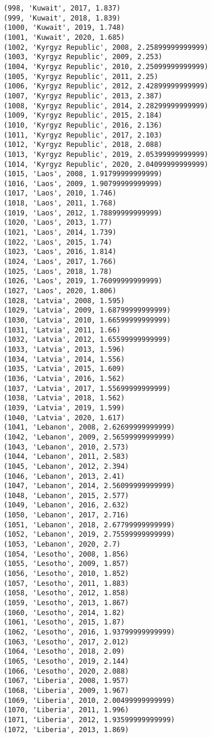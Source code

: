 \documentclass[11pt]{article}
\begin{document}
\begin{Verbatim}[commandchars=\\\{\}]
(998, 'Kuwait', 2017, 1.837)
(999, 'Kuwait', 2018, 1.839)
(1000, 'Kuwait', 2019, 1.748)
(1001, 'Kuwait', 2020, 1.685)
(1002, 'Kyrgyz Republic', 2008, 2.25899999999999)
(1003, 'Kyrgyz Republic', 2009, 2.253)
(1004, 'Kyrgyz Republic', 2010, 2.25099999999999)
(1005, 'Kyrgyz Republic', 2011, 2.25)
(1006, 'Kyrgyz Republic', 2012, 2.42899999999999)
(1007, 'Kyrgyz Republic', 2013, 2.387)
(1008, 'Kyrgyz Republic', 2014, 2.28299999999999)
(1009, 'Kyrgyz Republic', 2015, 2.184)
(1010, 'Kyrgyz Republic', 2016, 2.136)
(1011, 'Kyrgyz Republic', 2017, 2.103)
(1012, 'Kyrgyz Republic', 2018, 2.088)
(1013, 'Kyrgyz Republic', 2019, 2.05399999999999)
(1014, 'Kyrgyz Republic', 2020, 2.04099999999999)
(1015, 'Laos', 2008, 1.91799999999999)
(1016, 'Laos', 2009, 1.90799999999999)
(1017, 'Laos', 2010, 1.746)
(1018, 'Laos', 2011, 1.768)
(1019, 'Laos', 2012, 1.78899999999999)
(1020, 'Laos', 2013, 1.77)
(1021, 'Laos', 2014, 1.739)
(1022, 'Laos', 2015, 1.74)
(1023, 'Laos', 2016, 1.814)
(1024, 'Laos', 2017, 1.766)
(1025, 'Laos', 2018, 1.78)
(1026, 'Laos', 2019, 1.76099999999999)
(1027, 'Laos', 2020, 1.806)
(1028, 'Latvia', 2008, 1.595)
(1029, 'Latvia', 2009, 1.68799999999999)
(1030, 'Latvia', 2010, 1.66599999999999)
(1031, 'Latvia', 2011, 1.66)
(1032, 'Latvia', 2012, 1.65599999999999)
(1033, 'Latvia', 2013, 1.596)
(1034, 'Latvia', 2014, 1.556)
(1035, 'Latvia', 2015, 1.609)
(1036, 'Latvia', 2016, 1.562)
(1037, 'Latvia', 2017, 1.55699999999999)
(1038, 'Latvia', 2018, 1.562)
(1039, 'Latvia', 2019, 1.599)
(1040, 'Latvia', 2020, 1.617)
(1041, 'Lebanon', 2008, 2.62699999999999)
(1042, 'Lebanon', 2009, 2.56599999999999)
(1043, 'Lebanon', 2010, 2.573)
(1044, 'Lebanon', 2011, 2.583)
(1045, 'Lebanon', 2012, 2.394)
(1046, 'Lebanon', 2013, 2.41)
(1047, 'Lebanon', 2014, 2.56099999999999)
(1048, 'Lebanon', 2015, 2.577)
(1049, 'Lebanon', 2016, 2.632)
(1050, 'Lebanon', 2017, 2.716)
(1051, 'Lebanon', 2018, 2.67799999999999)
(1052, 'Lebanon', 2019, 2.75599999999999)
(1053, 'Lebanon', 2020, 2.7)
(1054, 'Lesotho', 2008, 1.856)
(1055, 'Lesotho', 2009, 1.857)
(1056, 'Lesotho', 2010, 1.852)
(1057, 'Lesotho', 2011, 1.883)
(1058, 'Lesotho', 2012, 1.858)
(1059, 'Lesotho', 2013, 1.867)
(1060, 'Lesotho', 2014, 1.82)
(1061, 'Lesotho', 2015, 1.87)
(1062, 'Lesotho', 2016, 1.93799999999999)
(1063, 'Lesotho', 2017, 2.012)
(1064, 'Lesotho', 2018, 2.09)
(1065, 'Lesotho', 2019, 2.144)
(1066, 'Lesotho', 2020, 2.088)
(1067, 'Liberia', 2008, 1.957)
(1068, 'Liberia', 2009, 1.967)
(1069, 'Liberia', 2010, 2.00499999999999)
(1070, 'Liberia', 2011, 1.996)
(1071, 'Liberia', 2012, 1.93599999999999)
(1072, 'Liberia', 2013, 1.869)

\end{Verbatim}
\end{document}
